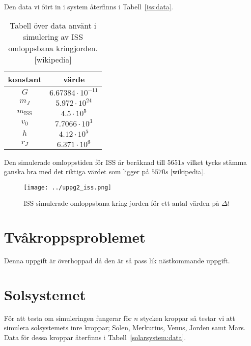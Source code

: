 \documentclass[a4]{article}
\begin{document}
Den data vi fört in i system återfinns i Tabell~\vref{iss:data}.
\begin{table}
\begin{center}
\begin{tabular}{c|c}
	konstant & värde \\
	\hline
	$G$       &  $6.67384 \cdot 10^{-11}$ \\
	$m_J$     &  $5.972 \cdot 10^{24}$ \\
	$m_{\mathrm{ISS}}$ &  $4.5 \cdot 10^5$ \\
	$v_0$     &  $7.7066 \cdot 10^3$ \\
	$h$       &  $4.12 \cdot 10^5$ \\
	$r_J$     &  $6.371 \cdot 10^6$
\end{tabular}
\caption{
Tabell över data använt i simulering av ISS omloppsbana
kringjorden.[wikipedia]}
\label{iss:data}
\end{center}
\end{table}

Den simulerade omloppstiden för ISS är beräknad till $5651s$ vilket tycks
stämma ganska bra med det riktiga värdet som ligger på $5570s$ [wikipedia].

\begin{figure}
\begin{center}
	\texttt{[image: ../uppg2\_iss.png]}
\end{center}
\caption{
	ISS simulerade omloppsbana kring jorden för ett antal värden på $\Delta t$
}
\end{figure}

\section{Tvåkroppsproblemet}
Denna uppgift är överhoppad då den är så pass lik nästkommande uppgift.

\section{Solsystemet}
För att testa om simuleringen fungerar för $n$ stycken kroppar så testar vi att
simulera solsystemets inre kroppar; Solen, Merkurius, Venus, Jorden samt Mars.
Data för dessa kroppar återfinns i Tabell~\vref{solarsystem:data}.
\end{document}
